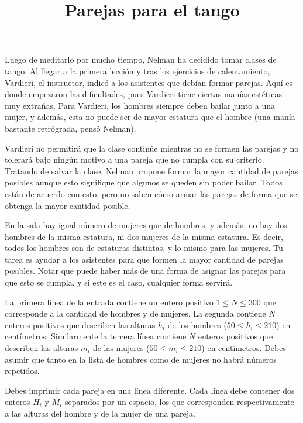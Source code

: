 \documentclass{oci}
\title{Parejas para el tango}
\begin{document}
\begin{problemDescription}
Luego de meditarlo por mucho tiempo, Nelman ha decidido tomar clases de tango.
Al llegar a la primera lección y tras los ejercicios de calentamiento, Vardieri, el instructor, indicó a los asistentes que debían formar parejas.
Aquí es donde empezaron las dificultades, pues Vardieri tiene ciertas manías estéticas muy extrañas.
Para Vardieri, los hombres siempre deben bailar junto a una mujer, y además, esta no puede ser de mayor estatura que el hombre (una manía bastante retrógrada, pensó Nelman).

Vardieri no permitirá que la clase continúe mientras no se formen las parejas y no tolerará bajo ningún motivo a una pareja que no cumpla con su criterio.
Tratando de salvar la clase, Nelman propone formar la mayor cantidad de parejas posibles aunque esto signifique que algunos se queden sin poder bailar.
Todos están de acuerdo con esto, pero no saben cómo armar las parejas de forma que se obtenga la mayor cantidad posible.

En la sala hay igual número de mujeres que de hombres, y además, no hay dos hombres de la misma estatura, ni dos mujeres de la misma estatura.
Es decir, todos los hombres son de estaturas distintas, y lo mismo para las mujeres.
Tu tarea es ayudar a los asistentes para que formen la mayor cantidad de parejas posibles.
Notar que puede haber más de una forma de asignar las parejas para que esto se cumpla, y si este es el caso, cualquier forma servirá.

\end{problemDescription}

\begin{inputDescription}
La primera línea de la entrada contiene un entero positivo $1 \leq N \leq 300$ que corresponde a la cantidad de hombres y de mujeres.
La segunda contiene $N$ enteros positivos que describen las alturas $h_i$ de los hombres ($50 \leq h_i \leq 210$) en centímetros.
Similarmente la tercera línea contiene $N$ enteros positivos que describen las alturas $m_i$ de las mujeres ($50 \le m_i \le 210$) en centímetros.
Debes asumir que tanto en la lista de hombres como de mujeres no habrá números repetidos.
\end{inputDescription}

\begin{outputDescription}
Debes imprimir cada pareja en una línea diferente.
Cada línea debe contener dos enteros $H_i$ y $M_i$ separados por un espacio, los que corresponden respectivamente a las alturas del hombre y de la mujer de una pareja.
\end{outputDescription}
\end{document}
